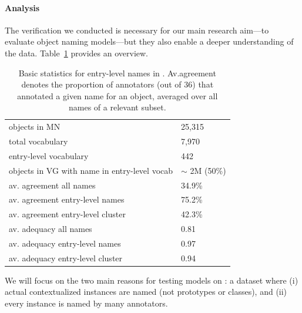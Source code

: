 

\paragraph{Analysis}
\label{sect:mn_analysis}

The verification we conducted is necessary for our main research aim---to evaluate  object naming models---but they also enable a deeper understanding of the \mn data.
Table~\ref{tab:stat-entry-level} provides an overview.
\begin{table}[t]
	\centering
	\small
	\begin{tabular}{p{5cm}l}
		\toprule		
		objects in MN & 25,315\\
		total vocabulary &  7,970\\
		entry-level vocabulary & 442\\
		objects in VG with name in entry-level vocab & $\sim$ 2M (50\%)\\
		\midrule
		av. agreement all names & 34.9\%\\
		av. agreement entry-level names & 75.2\%\\
		av. agreement entry-level cluster & 42.3\%\\
		\midrule
		av. adequacy all names & 0.81\\
		av. adequacy entry-level names & 0.97 \\
		av. adequacy entry-level cluster & 0.94 \\
		\bottomrule	
	\end{tabular}
	\caption{Basic statistics for entry-level names in \mn. Av.agreement denotes the proportion of annotators (out of 36) that annotated a given name for an object, averaged over all names of a relevant subset.}
	\label{tab:stat-entry-level}
\end{table}
We will focus on the two main reasons for testing models on \mn: a dataset where (i) actual contextualized instances are named (not prototypes or classes), and (ii) every instance is named by many annotators.

